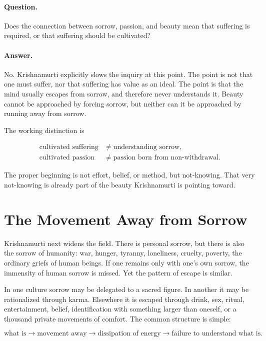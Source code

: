\paragraph{Question.}
Does the connection between sorrow, passion, and beauty mean that suffering is required, or that suffering should be cultivated?

\paragraph{Answer.}
No. Krishnamurti explicitly slows the inquiry at this point. The point is not that one must suffer, nor that suffering has value as an ideal. The point is that the mind usually escapes from sorrow, and therefore never understands it. Beauty cannot be approached by forcing sorrow, but neither can it be approached by running away from sorrow.

The working distinction is

\begin{align}
\text{cultivated suffering} &\neq \text{understanding sorrow},\\
\text{cultivated passion} &\neq \text{passion born from non-withdrawal}.
\end{align}

The proper beginning is not effort, belief, or method, but not-knowing. That very not-knowing is already part of the beauty Krishnamurti is pointing toward.

\section{The Movement Away from Sorrow}

Krishnamurti next widens the field. There is personal sorrow, but there is also the sorrow of humanity: war, hunger, tyranny, loneliness, cruelty, poverty, the ordinary griefs of human beings. If one remains only with one's own sorrow, the immensity of human sorrow is missed. Yet the pattern of escape is similar.

In one culture sorrow may be delegated to a sacred figure. In another it may be rationalized through karma. Elsewhere it is escaped through drink, sex, ritual, entertainment, belief, identification with something larger than oneself, or a thousand private movements of comfort. The common structure is simple:

\begin{equation}
\text{what is}
\longrightarrow
\text{movement away}
\longrightarrow
\text{dissipation of energy}
\longrightarrow
\text{failure to understand what is}.
\end{equation}

